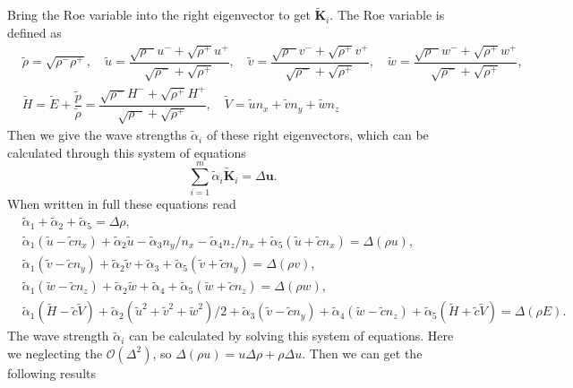 \documentclass{develop-note}
\begin{document}
Bring the Roe variable into the right eigenvector to get $\tilde{\mathbf{K}}_{i}$. The Roe variable is defined as
\begin{equation}
  \begin{aligned}
    &\tilde{\rho}=\sqrt{\rho^{-}\rho^{+}},\quad\tilde{u}=\dfrac{\sqrt{\rho^{-}}u^{-}+\sqrt{\rho^{+}}u^{+}}{\sqrt{\rho^{-}}+\sqrt{\rho^{+}}},\quad\tilde{v}=\dfrac{\sqrt{\rho^{-}}v^{-}+\sqrt{\rho^{+}}v^{+}}{\sqrt{\rho^{-}}+\sqrt{\rho^{+}}},\quad\tilde{w}=\dfrac{\sqrt{\rho^{-}}w^{-}+\sqrt{\rho^{+}}w^{+}}{\sqrt{\rho^{-}}+\sqrt{\rho^{+}}},\\
    &\tilde{H}=\tilde{E}+\dfrac{\tilde{p}}{\tilde{\rho}}=\dfrac{\sqrt{\rho^{-}}H^{-}+\sqrt{\rho^{+}}H^{+}}{\sqrt{\rho^{-}}+\sqrt{\rho^{+}}},\quad\tilde{V}=\tilde{u}n_{x}+\tilde{v}n_{y}+\tilde{w}n_{z}
  \end{aligned}
\end{equation}
Then we give the wave strengths $\tilde{\alpha}_{i}$ of these right eigenvectors, which can be calculated through this system of equations
\begin{equation}
  \sum_{i=1}^{m}\tilde{\alpha}_{i}\tilde{\mathbf{K}}_{i}=\Delta\mathbf{u}.
\end{equation}
When written in full these equations read
\begin{equation}
  \begin{aligned}
    &\tilde{\alpha}_{1}+\tilde{\alpha}_{2}+\tilde{\alpha}_{5}=\Delta\rho,\\
    &\tilde{\alpha}_{1}(\tilde{u}-\tilde{c}n_{x})+\tilde{\alpha}_{2}\tilde{u}-\tilde{\alpha}_{3}n_{y}/n_{x}-\tilde{\alpha}_{4}n_{z}/n_{x}+\tilde{\alpha}_{5}(\tilde{u}+\tilde{c}n_{x})=\Delta(\rho u),\\
    &\tilde{\alpha}_{1}(\tilde{v}-\tilde{c}n_{y})+\tilde{\alpha}_{2}\tilde{v}+\tilde{\alpha}_{3}+\tilde{\alpha}_{5}(\tilde{v}+\tilde{c}n_{y})=\Delta(\rho v),\\
    &\tilde{\alpha}_{1}(\tilde{w}-\tilde{c}n_{z})+\tilde{\alpha}_{2}\tilde{w}+\tilde{\alpha}_{4}+\tilde{\alpha}_{5}(\tilde{w}+\tilde{c}n_{z})=\Delta(\rho w),\\
    &\tilde{\alpha}_{1}(\tilde{H}-\tilde{c}\tilde{V})+\tilde{\alpha}_{2}(\tilde{u}^{2}+\tilde{v}^{2}+\tilde{w}^{2})/2+\tilde{\alpha}_{3}(\tilde{v}-\tilde{c}n_{y})+\tilde{\alpha}_{4}(\tilde{w}-\tilde{c}n_{z})+\tilde{\alpha}_{5}(\tilde{H}+\tilde{c}\tilde{V})=\Delta(\rho E).
  \end{aligned}
\end{equation}
The wave strength $\tilde{\alpha}_{i}$ can be calculated by solving this system of equations. Here we neglecting the $\mathcal{O}(\Delta^{2})$, so $\Delta(\rho u)=u\Delta\rho+\rho\Delta u$. Then we can get the following results
\end{document}

